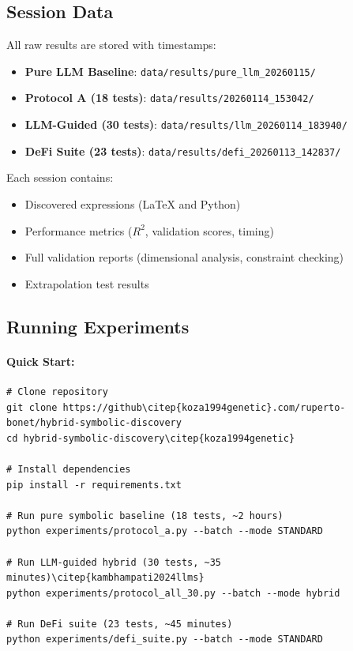\documentclass[twoside,11pt]{article}
\begin{document}
\subsection{Session Data}

All raw results are stored with timestamps:

\begin{itemize}
\item \textbf{Pure LLM Baseline}: \texttt{data/results/pure\_llm\_20260115/}\citep{kambhampati2024llms}
\item \textbf{Protocol A (18 tests)}: \texttt{data/results/20260114\_153042/}
\item \textbf{LLM-Guided (30 tests)}: \texttt{data/results/llm\_20260114\_183940/}\citep{kambhampati2024llms}
\item \textbf{DeFi Suite (23 tests)}: \texttt{data/results/defi\_20260113\_142837/}
\end{itemize}

Each session contains:
\begin{itemize}
\item Discovered expressions (LaTeX and Python)
\item Performance metrics ($R^2$, validation scores, timing)
\item Full validation reports (dimensional analysis, constraint checking)
\item Extrapolation test results
\end{itemize}

\subsection{Running Experiments}

\paragraph{Quick Start:}
\begin{small}
\begin{verbatim}
# Clone repository
git clone https://github\citep{koza1994genetic}.com/ruperto-bonet/hybrid-symbolic-discovery
cd hybrid-symbolic-discovery\citep{koza1994genetic}

# Install dependencies
pip install -r requirements.txt

# Run pure symbolic baseline (18 tests, ~2 hours)
python experiments/protocol_a.py --batch --mode STANDARD

# Run LLM-guided hybrid (30 tests, ~35 minutes)\citep{kambhampati2024llms}
python experiments/protocol_all_30.py --batch --mode hybrid

# Run DeFi suite (23 tests, ~45 minutes)
python experiments/defi_suite.py --batch --mode STANDARD
\end{verbatim}
\end{small}
\end{document}
